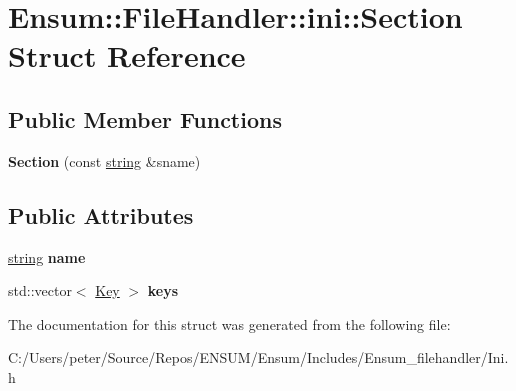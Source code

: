 \hypertarget{struct_ensum_1_1_file_handler_1_1ini_1_1_section}{}\section{Ensum\+:\+:File\+Handler\+:\+:ini\+:\+:Section Struct Reference}
\label{struct_ensum_1_1_file_handler_1_1ini_1_1_section}
\subsection*{Public Member Functions}
\begin{DoxyCompactItemize}
\item 
{\bfseries Section} (const \hyperlink{class_ensum_1_1string}{string} \&sname)\hypertarget{struct_ensum_1_1_file_handler_1_1ini_1_1_section_aece352bd19575c13a3359ee2a16f375d}{}\label{struct_ensum_1_1_file_handler_1_1ini_1_1_section_aece352bd19575c13a3359ee2a16f375d}

\end{DoxyCompactItemize}
\subsection*{Public Attributes}
\begin{DoxyCompactItemize}
\item 
\hyperlink{class_ensum_1_1string}{string} {\bfseries name}\hypertarget{struct_ensum_1_1_file_handler_1_1ini_1_1_section_aaef5921ebec35dfe6b7ac00cde2e71a6}{}\label{struct_ensum_1_1_file_handler_1_1ini_1_1_section_aaef5921ebec35dfe6b7ac00cde2e71a6}

\item 
std\+::vector$<$ \hyperlink{struct_ensum_1_1_file_handler_1_1ini_1_1_key}{Key} $>$ {\bfseries keys}\hypertarget{struct_ensum_1_1_file_handler_1_1ini_1_1_section_a4ef77125d407902a380c30d3f0f120da}{}\label{struct_ensum_1_1_file_handler_1_1ini_1_1_section_a4ef77125d407902a380c30d3f0f120da}

\end{DoxyCompactItemize}


The documentation for this struct was generated from the following file\+:\begin{DoxyCompactItemize}
\item 
C\+:/\+Users/peter/\+Source/\+Repos/\+E\+N\+S\+U\+M/\+Ensum/\+Includes/\+Ensum\+\_\+filehandler/Ini.\+h\end{DoxyCompactItemize}

